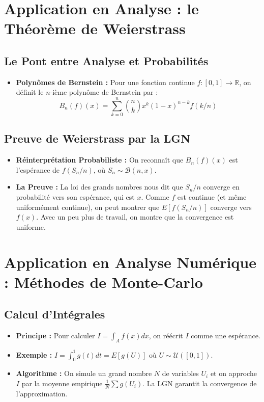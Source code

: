 \documentclass[12pt, a4paper, parskip=full]{report}
\theoremstyle{agregstyle}
\begin{document}
\section{Application en Analyse : le Théorème de Weierstrass}
\subsection{Le Pont entre Analyse et Probabilités}
\begin{itemize}
    \item \textbf{Polynômes de Bernstein :} Pour une fonction continue $f:[0,1] \to \mathbb{R}$, on définit le $n$-ième polynôme de Bernstein par :
    $$ B_n(f)(x) = \sum_{k=0}^n \binom{n}{k} x^k (1-x)^{n-k} f(k/n) $$
\end{itemize}
\subsection{Preuve de Weierstrass par la LGN}
\begin{itemize}
    \item \textbf{Réinterprétation Probabiliste :} On reconnaît que $B_n(f)(x)$ est l'espérance de $f(S_n/n)$, où $S_n \sim \mathcal{B}(n,x)$.
    \item \textbf{La Preuve :} La loi des grands nombres nous dit que $S_n/n$ converge en probabilité vers son espérance, qui est $x$. Comme $f$ est continue (et même uniformément continue), on peut montrer que $E[f(S_n/n)]$ converge vers $f(x)$. Avec un peu plus de travail, on montre que la convergence est uniforme.
\end{itemize}

\section{Application en Analyse Numérique : Méthodes de Monte-Carlo}
\subsection{Calcul d'Intégrales}
\begin{itemize}
    \item \textbf{Principe :} Pour calculer $I = \int_A f(x)dx$, on réécrit $I$ comme une espérance.
    \item \textbf{Exemple :} $I = \int_0^1 g(t)dt = E[g(U)]$ où $U \sim \mathcal{U}([0,1])$.
    \item \textbf{Algorithme :} On simule un grand nombre $N$ de variables $U_i$ et on approche $I$ par la moyenne empirique $\frac{1}{N}\sum g(U_i)$. La LGN garantit la convergence de l'approximation.
\end{itemize}
\end{document}
